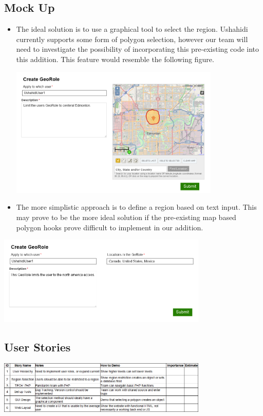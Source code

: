\documentclass{article}
\begin{document}
\subsection{Mock Up}
\begin{itemize}
\item The ideal solution is to use a graphical tool to select the region. Ushahidi currently supports some form of polygon selection, however our team will need to investigate the possibility of incorporating this pre-existing code into this addition. This feature would resemble the following figure.
\begin{minipage}{\linewidth}
  \centering
  \includegraphics[width=100mm]{mockupMap.png}
\end{minipage}
\item The more simplistic approach is to define a region based on text input. This may prove to be the more ideal solution if the pre-existing map based polygon hooks prove difficult to implement in our addition.
\end{itemize}
\begin{minipage}{\linewidth}
  \centering
  \includegraphics[width=100mm]{mockupNomap.png}
\end{minipage}
\subsection{User Stories}
\includegraphics[width=100mm]{ProjectBacklogImage.png}
\end{document}
